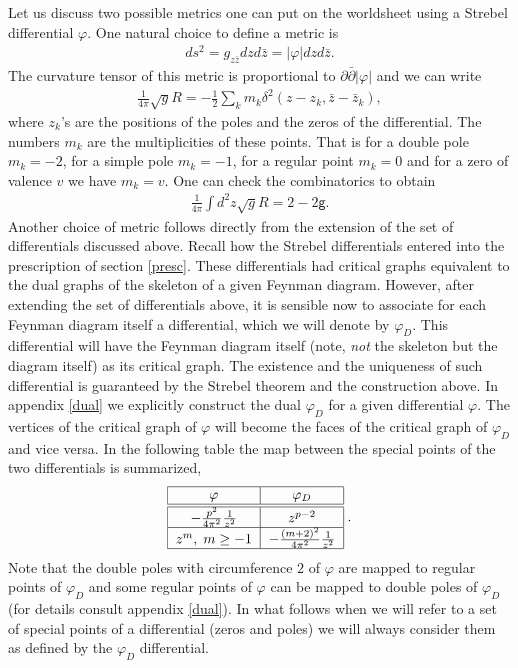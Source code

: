 \documentclass[11pt]{JHEP3}
\def\be{\begin{eqnarray}}
\def\ee{\end{eqnarray}}
\def\half{\frac{1}{2}}
\def\d{\partial}
\def\vf{\varphi}
\def\gg{\mathsf g }
\begin{document}
Let us discuss two possible metrics one can put
on the worldsheet using a Strebel differential $\vf$.
One natural choice to define a metric is
\be
ds^2=g_{z\bar z}dzd\bar z=|\vf| dz d\bar z.
\ee The curvature tensor of this metric is proportional to $\d\bar\d |\vf|$ and we can write
\be
\frac{1}{4\pi}\sqrt{g}R=-\half\sum_{k}m_k\delta^2(z-z_k,\bar z-\bar z_k),
\ee where $z_k$'s are the positions of the poles and the zeros of the differential. The
numbers $m_k$ are the multiplicities of these points. That is for a double pole $m_k=-2$,
for a simple pole $m_k=-1$, for a regular point $m_k=0$ and for a zero of valence $v$ we have
$m_k=v$. One can check the combinatorics to obtain 
\be
\frac{1}{4\pi} \int d^2z \sqrt{g}R= 2-2\gg.
\ee Another choice of metric follows directly from the extension of the set of differentials discussed above. Recall how the Strebel differentials entered into the prescription
of section \ref{presc}. These differentials had critical graphs equivalent to the dual graphs of 
the skeleton of a given Feynman diagram. However, after extending the set of differentials above,
it is sensible now to associate for each Feynman diagram itself a differential, which we
will denote by $\vf_D$. 
 This differential will have the Feynman diagram itself (note, \textit{not}
the skeleton but the diagram itself) as its critical graph. The existence and the uniqueness 
of such differential is guaranteed by the Strebel theorem and the construction above.
In appendix \ref{dual} we explicitly construct the dual $\vf_D$ for a given differential $\vf$.
 The vertices
of the critical graph of $\vf$ will become the faces of the critical graph of $\vf_D$ and vice versa. In the following table the map between 
the special points of the two differentials is summarized,
\be
\begin{tabular}{|c|c|}
\hline
$\vf$ & $\vf_D$\\
\hline\hline
$-\frac{p^2}{4\pi^2}\frac{1}{z^2}$ & $z^{p-2}$\\\hline
$z^m,\;m\geq-1$ & $-\frac{(m+2)^2}{4\pi^2}\frac{1}{z^2}$\\\hline
\end{tabular}\;.
\ee
Note that the double poles
with circumference $2$ of $\vf$ are mapped to regular points of $\vf_D$ and some regular
points of $\vf$ can be mapped to double poles of $\vf_D$ (for details consult appendix \ref{dual}). In what follows when we will
refer to a set of special points of a differential (zeros and poles) we will always consider
them as defined by the $\vf_D$ differential.
 
\end{document}
